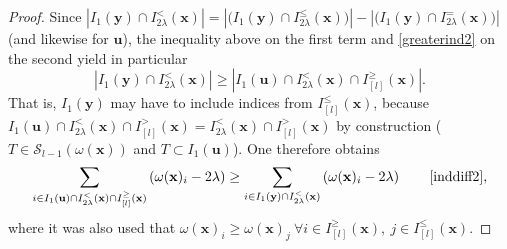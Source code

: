 \documentclass[11pt,a4paper]{article}
\newcommand{\eqjust}[1]{\qquad\eqref{#1}}
\theoremstyle{plain}
\theoremstyle{definition}
\theoremstyle{remark}
\newcommand*\x{\mathbf{x}}
\newcommand*\U{\mathbf{u}}
\newcommand*\y{\mathbf{y}}
\begin{document}
\begin{proof}
  Since
  \(|I_1(\y)\cap I_{2\lambda}^<(\x)|=|\bigl(I_1(\y)\cap I_{2\lambda}^\leq(\x)\bigr)|-|\bigl(I_1(\y)\cap I_{2\lambda}^=(\x)\bigr)|\)
  (and likewise for \(\U\)), the inequality above on the first term and
  \eqref{greaterind2} on the second yield in particular
  \begin{equation}
    \label{inddiff2}
    |I_1(\y) \cap I_{2\lambda}^<(\x)|\geq |I_1(\U)\cap I_{2\lambda}^<(\x)\cap I_{[l]}^\geq(\x)|.
  \end{equation}
  That is, \(I_1(\y)\) may have to include indices from \(I_{[l]}^\leq(\x)\), because \(I_1(\U)\cap I_{2\lambda}^<(\x)\cap I_{[l]}^>(\x)=I_{2\lambda}^<(\x)\cap I_{[l]}^>(\x)\) by construction (\(T\in\mathcal{S}_{l-1}(\omega (\x))\) and \(T\subset I_1(\U)\)).
  One therefore obtains
  \begin{equation}
    \label{full}
    \sum_{i \in I_1(\U)\cap I_{2\lambda}^<(\x)\cap I_{[l]}^\geq(\x)}\left(\omega(\x)_i-2 \lambda\right)
    \geq \sum_{i \in I_1(\y) \cap I_{2\lambda}^<(\x)}\left(\omega(\x)_i-2 \lambda\right)
    \eqjust{inddiff2},
  \end{equation}
  where it was also used that
  \(\omega(\x)_{i}\geq \omega(\x)_j\ \forall i\in I^\geq_{[l]}(\x),\ j\in I^\leq_{[l]}(\x)\).


\end{proof}
\end{document}
